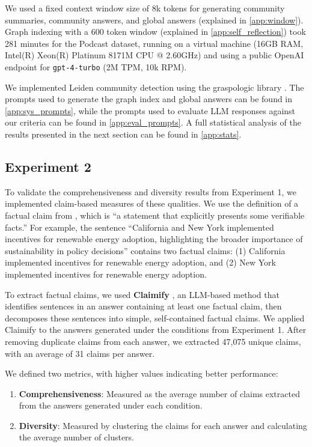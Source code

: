 \documentclass{article}
\begin{document}
We used a fixed context window size of 8k tokens for generating community summaries, community answers, and global answers (explained in \autoref{app:window}).
Graph indexing with a 600 token window (explained in \autoref{app:self_reflection}) took 281 minutes for the Podcast dataset, running on a virtual machine (16GB RAM, Intel(R) Xeon(R) Platinum 8171M CPU @ 2.60GHz) and using a public OpenAI endpoint for \texttt{gpt-4-turbo} (2M TPM, 10k RPM).

We implemented Leiden community detection using the graspologic library \citep{chung2019graspy}.
The prompts used to generate the graph index and global answers can be found in \autoref{app:sys_prompts}, while the prompts used to evaluate LLM responses against our criteria can be found in \autoref{app:eval_prompts}.
A full statistical analysis of the results presented in the next section can be found in \autoref{app:stats}.

\subsection{Experiment 2}
To validate the comprehensiveness and diversity results from Experiment 1, we implemented claim-based measures of these qualities. We use the definition of a factual claim from \citet{afacta}, which is “a statement that explicitly presents some verifiable facts.” For example, the sentence “California and New York implemented incentives for renewable energy adoption, highlighting the broader importance of sustainability in policy decisions” contains two factual claims: (1) California implemented incentives for renewable energy adoption, and (2) New York implemented incentives for renewable energy adoption.

To extract factual claims, we used \textbf{Claimify} \citep{claimify}, an LLM-based method that identifies sentences in an answer containing at least one factual claim, then decomposes these sentences into simple, self-contained factual claims. We applied Claimify to the answers generated under the conditions from Experiment 1. After removing duplicate claims from each answer, we extracted 47,075 unique claims, with an average of 31 claims per answer.

We defined two metrics, with higher values indicating better performance:
\begin{enumerate}
\item \textbf{Comprehensiveness}: Measured as the average number of claims extracted from the answers generated under each condition.
\item \textbf{Diversity}: Measured by clustering the claims for each answer and calculating the average number of clusters.
\end{enumerate}
\end{document}
